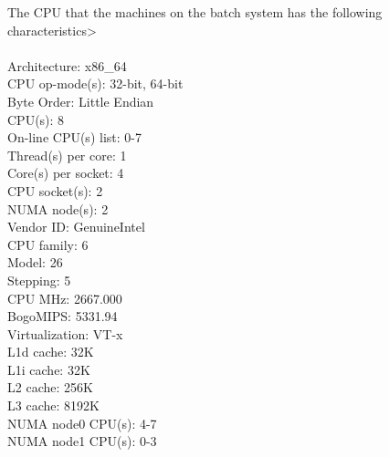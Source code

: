 The CPU that the machines on the batch system has the following characteristics>
\\ \\
Architecture:          x86\_64 \\
CPU op-mode(s):        32-bit, 64-bit \\
Byte Order:            Little Endian\\
CPU(s):                8\\
On-line CPU(s) list:   0-7\\
Thread(s) per core:    1\\
Core(s) per socket:    4\\
CPU socket(s):         2\\
NUMA node(s):          2\\
Vendor ID:             GenuineIntel\\
CPU family:            6\\
Model:                 26\\
Stepping:              5\\
CPU MHz:               2667.000\\
BogoMIPS:              5331.94\\
Virtualization:        VT-x\\
L1d cache:             32K\\
L1i cache:             32K\\
L2 cache:              256K\\
L3 cache:              8192K\\
NUMA node0 CPU(s):     4-7\\
NUMA node1 CPU(s):     0-3\\
\\

